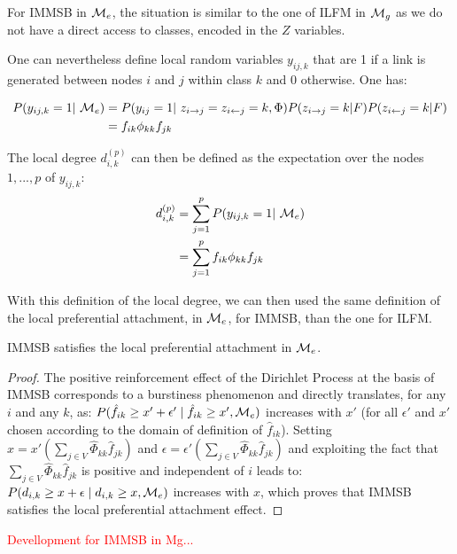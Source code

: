 For IMMSB in $\mathcal{M}_e$, the situation is similar to the one of ILFM in $\mathcal{M}_g$ as we do not have a direct access to classes, encoded in the $Z$ variables.

One can nevertheless define  local random variables $y_{ij,k}$ that are 1 if a link is generated between nodes $i$ and $j$ within class $k$ and 0 otherwise. One has:

\begin{align*}
P(y_{ij,k}=1 | \M_e) &= P(y_{ij}=1 | z_{i\rightarrow j} = z_{i\leftarrow j}=k, \Phi) P(z_{i\rightarrow j}=k|F)P(z_{i\leftarrow j}=k|F) \\
    &= f_{ik} \phi_{kk} f_{jk}
\end{align*}

The local degree $d_{i,k}^{(p)}$ can then be defined as the expectation over the nodes $1,...,p$ of $y_{ij,k}$:
\begin{align*}
d_{i,k}^{(p)} &= \sum_{j=1}^p P(y_{ij,k}=1 | \M_e)  \\
    &= \sum_{j=1}^p f_{ik} \phi_{kk} f_{jk}
\end{align*}

With this definition of the local degree, we can then used the same definition of the local preferential attachment, in $\mathcal{M}_e$, for IMMSB, than the one for ILFM. 

\begin{proposition}
IMMSB satisfies the local preferential attachment in $\mathcal{M}_e$.
\end{proposition}

\begin{proof}
The positive reinforcement effect of the Dirichlet Process \cite{HDP} at the basis of IMMSB corresponds to a burstiness phenomenon and directly translates, for any $i$ and any $k$, as: $P(\hat{f}_{ik} \ge x'+\epsilon' \mid \hat{f}_{ik} \ge x',\mathcal{M}_e)$ increases with $x'$ (for all $\epsilon'$ and $x'$ chosen according to the domain of definition of $\hat{f}_{ik}$). Setting $x=x'(\sum_{j\in V} \hat{\Phi}_{kk} \hat{f}_{jk})$ and $\epsilon = \epsilon'(\sum_{j\in V} \hat{\Phi}_{kk} \hat{f}_{jk})$ and exploiting the fact that $\sum_{j\in V} \hat{\Phi}_{kk} \hat{f}_{jk}$ is positive and independent of $i$ leads to: $P(d_{i,k} \ge x+\epsilon \mid d_{i,k} \ge x, \mathcal{M}_e)$ increases with $x$, which proves that IMMSB satisfies the local preferential attachment effect.

\end{proof}


\textcolor{red}{Devellopment for IMMSB in Mg...}

